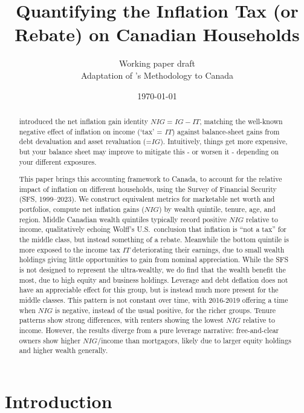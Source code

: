 \documentclass[11pt]{article}
\title{Quantifying the Inflation Tax (or Rebate) on Canadian Households}
\author{Working paper draft\\[0.5em]
\small Adaptation of \citep{wolff2023inflationtax}'s Methodology to Canada }
\date{\today}
\begin{document}
\maketitle

\begin{abstract}
 \citep{wolff2023inflationtax} introduced the net inflation gain identity $NIG=IG-IT$, matching the well-known negative effect of inflation on income (`tax' = $IT$) against balance-sheet gains from debt devaluation and asset revaluation (=$IG$). Intuitively, things get more expensive, but your balance sheet may improve to mitigate this - or worsen it - depending on your different exposures.
 
 This paper brings this accounting framework to Canada, to account for the relative impact of inflation on different households, using the Survey of Financial Security (SFS, 1999--2023). We construct equivalent metrics for marketable net worth and portfolios, compute net inflation gains ($NIG$) by wealth quintile, tenure, age, and region. Middle Canadian wealth quintiles typically record positive $NIG$ relative to income, qualitatively echoing Wolff's U.S.\ conclusion that inflation is ``not a tax'' for the middle class, but instead something of a rebate. Meanwhile the bottom quintile is more exposed to the income tax $IT$ deteriorating their earnings, due to small wealth holdings giving little opportunities to gain from nominal appreciation. While the SFS is not designed to represent the ultra-wealthy, we do find that the wealth benefit the most, due to high equity and business holdings. Leverage and debt deflation does not have an appreciable effect for this group, but is instead much more present for the middle classes. This pattern is not constant over time, with 2016-2019 offering a time when $NIG$ is negative, instead of the usual positive, for the richer groups. Tenure patterns show strong differences, with renters showing the lowest $NIG$ relative to income. However, the results diverge from a pure leverage narrative: free-and-clear owners show higher $NIG$/income than mortgagors, likely due to larger equity holdings and higher wealth generally.
\end{abstract}

\section{Introduction}
\end{document}
